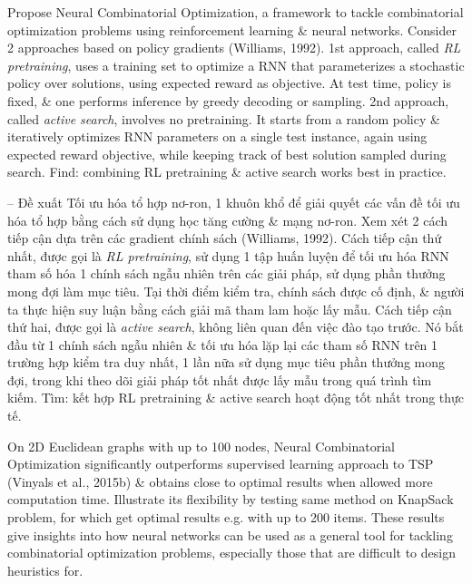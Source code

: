 \documentclass{article}
\begin{document}
\begin{itemize}
    Propose Neural Combinatorial Optimization, a framework to tackle combinatorial optimization problems using reinforcement learning \& neural networks. Consider 2 approaches based on policy gradients (Williams, 1992). 1st approach, called {\it RL pretraining}, uses a training set to optimize a RNN that parameterizes a stochastic policy over solutions, using expected reward as objective. At test time, policy is fixed, \& one performs inference by greedy decoding or sampling. 2nd approach, called {\it active search}, involves no pretraining. It starts from a random policy \& iteratively optimizes RNN parameters on a single test instance, again using expected reward objective, while keeping track of best solution sampled during search. Find: combining RL pretraining \& active search works best in practice.
    
    -- Đề xuất Tối ưu hóa tổ hợp nơ-ron, 1 khuôn khổ để giải quyết các vấn đề tối ưu hóa tổ hợp bằng cách sử dụng học tăng cường \& mạng nơ-ron. Xem xét 2 cách tiếp cận dựa trên các gradient chính sách (Williams, 1992). Cách tiếp cận thứ nhất, được gọi là {\it RL pretraining}, sử dụng 1 tập huấn luyện để tối ưu hóa RNN tham số hóa 1 chính sách ngẫu nhiên trên các giải pháp, sử dụng phần thưởng mong đợi làm mục tiêu. Tại thời điểm kiểm tra, chính sách được cố định, \& người ta thực hiện suy luận bằng cách giải mã tham lam hoặc lấy mẫu. Cách tiếp cận thứ hai, được gọi là {\it active search}, không liên quan đến việc đào tạo trước. Nó bắt đầu từ 1 chính sách ngẫu nhiên \& tối ưu hóa lặp lại các tham số RNN trên 1 trường hợp kiểm tra duy nhất, 1 lần nữa sử dụng mục tiêu phần thưởng mong đợi, trong khi theo dõi giải pháp tốt nhất được lấy mẫu trong quá trình tìm kiếm. Tìm: kết hợp RL pretraining \& active search hoạt động tốt nhất trong thực tế.
    
    On 2D Euclidean graphs with up to 100 nodes, Neural Combinatorial Optimization significantly outperforms supervised learning approach to TSP (Vinyals et al., 2015b) \& obtains close to optimal results when allowed more computation time. Illustrate its flexibility by testing same method on KnapSack problem, for which get optimal results e.g. with up to 200 items. These results give insights into how neural networks can be used as a general tool for tackling combinatorial optimization problems, especially those that are difficult to design heuristics for.
    

\end{itemize}
\end{document}

